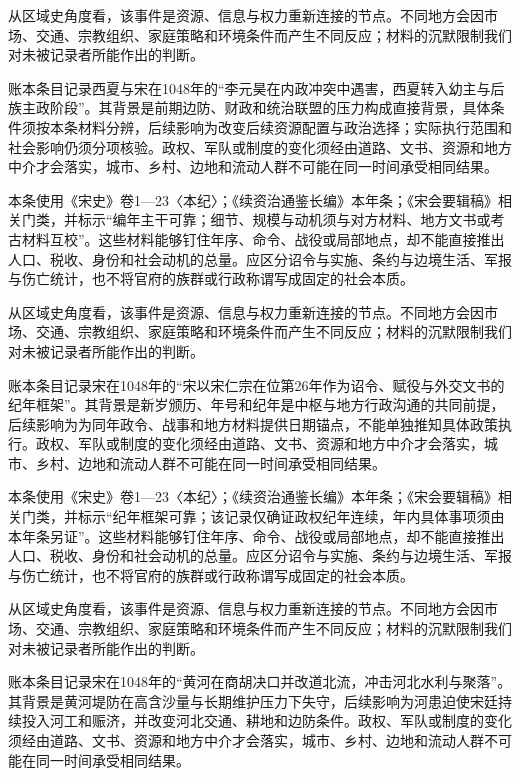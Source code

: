 从区域史角度看，该事件是资源、信息与权力重新连接的节点。不同地方会因市场、交通、宗教组织、家庭策略和环境条件而产生不同反应；材料的沉默限制我们对未被记录者所能作出的判断。

账本条目记录西夏与宋在1048年的“李元昊在内政冲突中遇害，西夏转入幼主与后族主政阶段”。其背景是前期边防、财政和统治联盟的压力构成直接背景，具体条件须按本条材料分辨，后续影响为改变后续资源配置与政治选择；实际执行范围和社会影响仍须分项核验。政权、军队或制度的变化须经由道路、文书、资源和地方中介才会落实，城市、乡村、边地和流动人群不可能在同一时间承受相同结果。

本条使用《宋史》卷1—23〈本纪〉；《续资治通鉴长编》本年条；《宋会要辑稿》相关门类，并标示“编年主干可靠；细节、规模与动机须与对方材料、地方文书或考古材料互校”。这些材料能够钉住年序、命令、战役或局部地点，却不能直接推出人口、税收、身份和社会动机的总量。应区分诏令与实施、条约与边境生活、军报与伤亡统计，也不将官府的族群或行政称谓写成固定的社会本质。

从区域史角度看，该事件是资源、信息与权力重新连接的节点。不同地方会因市场、交通、宗教组织、家庭策略和环境条件而产生不同反应；材料的沉默限制我们对未被记录者所能作出的判断。

账本条目记录宋在1048年的“宋以宋仁宗在位第26年作为诏令、赋役与外交文书的纪年框架”。其背景是新岁颁历、年号和纪年是中枢与地方行政沟通的共同前提，后续影响为为同年政令、战事和地方材料提供日期锚点，不能单独推知具体政策执行。政权、军队或制度的变化须经由道路、文书、资源和地方中介才会落实，城市、乡村、边地和流动人群不可能在同一时间承受相同结果。

本条使用《宋史》卷1—23〈本纪〉；《续资治通鉴长编》本年条；《宋会要辑稿》相关门类，并标示“纪年框架可靠；该记录仅确证政权纪年连续，年内具体事项须由本年条另证”。这些材料能够钉住年序、命令、战役或局部地点，却不能直接推出人口、税收、身份和社会动机的总量。应区分诏令与实施、条约与边境生活、军报与伤亡统计，也不将官府的族群或行政称谓写成固定的社会本质。

从区域史角度看，该事件是资源、信息与权力重新连接的节点。不同地方会因市场、交通、宗教组织、家庭策略和环境条件而产生不同反应；材料的沉默限制我们对未被记录者所能作出的判断。

账本条目记录宋在1048年的“黄河在商胡决口并改道北流，冲击河北水利与聚落”。其背景是黄河堤防在高含沙量与长期维护压力下失守，后续影响为河患迫使宋廷持续投入河工和赈济，并改变河北交通、耕地和边防条件。政权、军队或制度的变化须经由道路、文书、资源和地方中介才会落实，城市、乡村、边地和流动人群不可能在同一时间承受相同结果。

